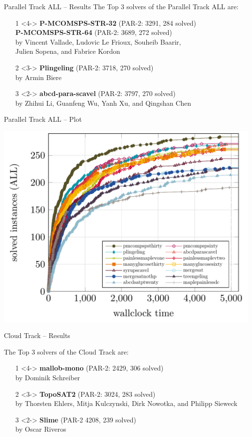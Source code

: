 \documentclass{beamer}
\begin{document}
\begin{frame}{Parallel Track ALL -- Results}
The Top 3 solvers of the Parallel Track ALL are:
\begin{itemize}
\item[1]<4-> {\bf P-MCOMSPS-STR-32} (PAR-2: 3291, 284 solved)\\
{\bf P-MCOMSPS-STR-64} (PAR-2: 3689, 272 solved)\\
by Vincent Vallade, Ludovic Le Frioux, Souheib Baarir,\\Julien Sopena, and Fabrice Kordon
\item[2]<3-> {\bf Plingeling} (PAR-2: 3718, 270 solved)\\
by Armin Biere
\item[3]<2-> {\bf abcd-para-scavel} (PAR-2: 3797, 270 solved)\\
by Zhihui Li, Guanfeng Wu, Yanh Xu, and Qingshan Chen
\end{itemize}
\end{frame}

\begin{frame}{Parallel Track ALL -- Plot}

\centering
\includegraphics[width=.8\textwidth]{parallel-ALL}

\end{frame}



\begin{frame}{Cloud Track -- Results}

The Top 3 solvers of the Cloud Track are:
\begin{itemize}

\item[1]<4-> {\bf mallob-mono} (PAR-2: 2429, 306 solved)\\
by Dominik Schreiber
\item[2]<3-> {\bf TopoSAT2} (PAR-2: 3024, 283 solved)\\
by Thorsten Ehlers, Mitja Kulczynski, Dirk Nowotka, and Philipp Sieweck
\item[3]<2-> {\bf Slime} (PAR-2 4208, 239 solved)\\
by Oscar Riveros
\end{itemize}


\end{frame}
\end{document}
